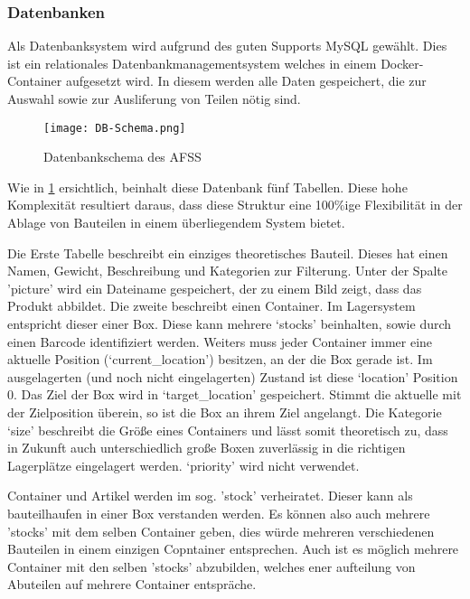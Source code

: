 \subsubsection{Datenbanken}

Als Datenbanksystem wird aufgrund des guten Supports MySQL gewählt. Dies ist ein relationales Datenbankmanagementsystem welches in einem Docker-Container aufgesetzt wird. In diesem werden alle Daten gespeichert, die zur Auswahl sowie zur Ausliferung von Teilen nötig sind.

\begin{figure}[h]
    \texttt{[image: DB-Schema.png]}
    \centering
    \caption{Datenbankschema des AFSS}
    \label{DB-Scema}
\end{figure}

Wie in \ref{DB-Scema} ersichtlich, beinhalt diese Datenbank fünf Tabellen. Diese hohe Komplexität resultiert daraus, dass diese Struktur eine 100\%ige Flexibilität in der Ablage von Bauteilen in einem überliegendem System bietet.

Die Erste Tabelle beschreibt ein einziges theoretisches Bauteil. Dieses hat einen Namen, Gewicht, Beschreibung und Kategorien zur Filterung. Unter der Spalte 'picture' wird ein Dateiname gespeichert, der zu einem Bild zeigt, dass das Produkt abbildet.
Die zweite beschreibt einen Container. Im Lagersystem entspricht dieser einer Box. Diese kann mehrere `stocks' beinhalten, sowie durch einen Barcode identifiziert werden. Weiters muss jeder Container immer eine aktuelle Position (`current\_location') besitzen, an der die Box gerade ist. Im ausgelagerten (und noch nicht eingelagerten) Zustand ist diese `location' Position 0. Das Ziel der Box wird in `target\_location' gespeichert. Stimmt die aktuelle mit der Zielposition überein, so ist die Box an ihrem Ziel angelangt. Die Kategorie `size' beschreibt die Größe eines Containers und lässt somit theoretisch zu, dass in Zukunft auch unterschiedlich große Boxen zuverlässig in die richtigen Lagerplätze eingelagert werden. `priority' wird nicht verwendet.

Container und Artikel werden im sog. 'stock' verheiratet. Dieser kann als bauteilhaufen in einer Box verstanden werden. Es können also auch mehrere 'stocks' mit dem selben Container geben, dies würde mehreren verschiedenen Bauteilen in einem einzigen Copntainer entsprechen. Auch ist es möglich mehrere Container mit den selben 'stocks' abzubilden, welches ener aufteilung von Abuteilen auf mehrere Container entspräche.

